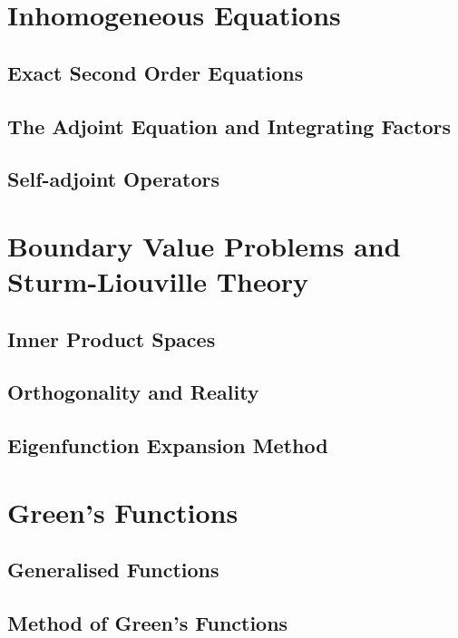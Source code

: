 \documentclass{article}
\theoremstyle{plain}
\theoremstyle{definition}
\numberwithin{equation}{section}
\begin{document}
\section{Inhomogeneous Equations}

\subsection{Exact Second Order Equations}

\subsection{The Adjoint Equation and Integrating Factors}

\subsection{Self-adjoint Operators}

\section{Boundary Value Problems and Sturm-Liouville Theory}

\subsection{Inner Product Spaces}

\subsection{Orthogonality and Reality}

\subsection{Eigenfunction Expansion Method}

\section{Green's Functions}

\subsection{Generalised Functions}

\subsection{Method of Green's Functions}
\end{document}
